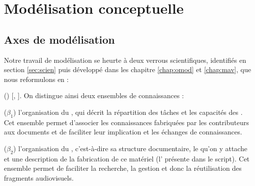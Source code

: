 \section{Modélisation conceptuelle}\label{sec:concept}

\subsection{Axes de modélisation}
Notre travail de modélisation se heurte à deux verrous scientifiques, identifiés en section \ref{sec:scien} puis développé dans les chapitre \ref{chap:omod} et \ref{chap:mav}, que nous reformulons en : 
\begin{liste}
 	\item[(\g{$\beta$})]  [, ]. 
 	On distingue ainsi deux ensembles de connaissances : 
 	\begin{listeni} 
 		\item[($\beta_1$)] l'organisation du , qui décrit la répartition des tâches et  les capacités des .
 		Cet ensemble permet d'associer les connaissances fabriquées par les contributeurs aux documents et de faciliter leur implication et les échanges de connaissances.
 		
 		\item[($\beta_2$)] l'organisation du , c'est-à-dire sa structure documentaire, le  qu'on y attache et une description de la fabrication de ce matériel (l' présente dans le script).
 		Cet ensemble permet de faciliter la recherche, la gestion et donc la réutilisation des fragments audiovisuels.
 	\end{listeni}


\end{liste}
